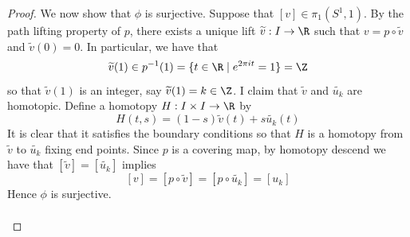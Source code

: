 \documentclass[a4paper]{article}
\begin{document}
\begin{thm}{}{}
\begin{proof}
We now show that $\phi$ is surjective. Suppose that $[v]\in\pi_1(S^1,1)$. By the path lifting property of $p$, there exists a unique lift $\widetilde{v}:I\to\R$ such that $v=p\circ\widetilde{v}$ and $\tilde{v}(0)=0$. In particular, we have that $$\widetilde{v}(1)\in p^{-1}(1)=\{t\in\R\;|\;e^{2\pi it}=1\}=\Z$$ so that $\widetilde{v}(1)$ is an integer, say $\widetilde{v}(1)=k\in\Z$. I claim that $\widetilde{v}$ and $\widetilde{u_k}$ are homotopic. Define a homotopy $H:I\times I\to\R$ by $$H(t,s)=(1-s)\widetilde{v}(t)+s\widetilde{u_k}(t)$$ It is clear that it satisfies the boundary conditions so that $H$ is a homotopy from $\widetilde{v}$ to $\widetilde{u_k}$ fixing end points. Since $p$ is a covering map, by homotopy descend we have that $[\widetilde{v}]=[\widetilde{u_k}]$ implies $$[v]=[p\circ\widetilde{v}]=[p\circ\widetilde{u_k}]=[u_k]$$ Hence $\phi$ is surjective. \\~\\


\end{proof}
\end{thm}
\end{document}
